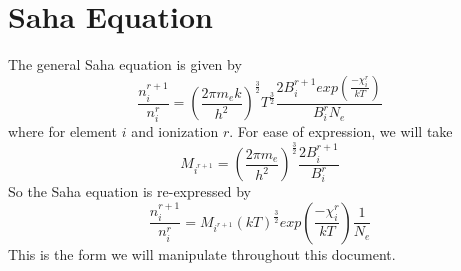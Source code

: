 \documentclass{article}
\begin{document}
	
	\newpage

	\section{Saha Equation}
		The general Saha equation is given by
		\begin{equation} \label{eq:saha_general}
			\frac{n^{r+1}_i}{n^r_i} = 
				\left( \frac{2 \pi m_e k}{h^2} \right)^\frac{3}{2} T^\frac{3}{2} 
				\frac{2 B^{r+1}_i exp\left(\frac{-\chi^r_i}{kT}\right)}{B^r_i N_e}
		\end{equation}
		where for element $i$ and ionization $r$. For ease of expression, we will take
		\begin{equation} \label{eq:saha_constant}
			M_{i^{r+1}} =	\left( \frac{2 \pi m_e}{h^2} \right)^\frac{3}{2}  
				\frac{2 B^{r+1}_i}{B^r_i}
		\end{equation}
		So the Saha equation is re-expressed by
		\begin{equation} \label{eq:saha_general_revised}
			\frac{n^{r+1}_i}{n^r_i} = M_{i^{r+1}} (kT)^\frac{3}{2} 
				exp\left(\frac{-\chi^r_i}{kT}\right) \frac{1}{N_e}
		\end{equation}
		This is the form we will manipulate throughout this document.
	
\end{document}
